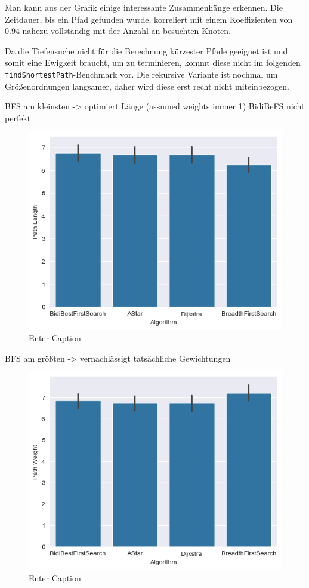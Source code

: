                 Man kann aus der Grafik einige interessante Zusammenhänge erkennen. Die Zeitdauer, bis ein Pfad gefunden wurde, korreliert mit einem Koeffizienten von $0.94$ nahezu vollständig mit der Anzahl an besuchten Knoten.

                Da die Tiefensuche nicht für die Berechnung kürzester Pfade geeignet ist und somit eine Ewigkeit braucht, um zu terminieren, kommt diese nicht im folgenden \lstinline{findShortestPath}-Benchmark vor. Die rekursive Variante ist nochmal um Größenordnungen langsamer, daher wird diese erst recht nicht miteinbezogen.

                BFS am kleinsten -> optimiert Länge (assumed weights immer 1)
                BidiBeFS nicht perfekt %

                \begin{figure}
                    \centering
                    \includegraphics[width=0.5\linewidth]{images/plots/modifiable/1000/1000/1000/spf/shortest/algo_length.png}
                    \caption{Enter Caption}
                    \label{fig:enter-label1}
                \end{figure}

                BFS am größten -> vernachlässigt tatsächliche Gewichtungen

                \begin{figure}
                    \centering
                    \includegraphics[width=0.5\linewidth]{images/plots/modifiable/1000/1000/1000/spf/shortest/algo_weight.png}
                    \caption{Enter Caption}
                    \label{fig:enter-label5}
                \end{figure}

